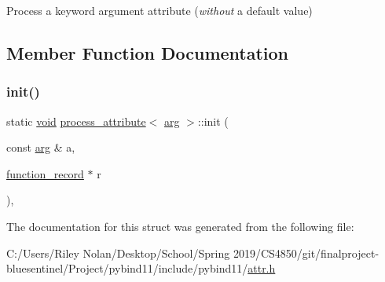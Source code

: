 Process a keyword argument attribute ({\itshape without} a default value) 

\subsection{Member Function Documentation}
\mbox{\label{structprocess__attribute_3_01arg_01_4_a256bf466859197e079b902fb77c5d01c}} 
\subsubsection{\texorpdfstring{init()}{init()}}
{\footnotesize\ttfamily static \mbox{\hyperlink{_s_d_l__opengles2__gl2ext_8h_ae5d8fa23ad07c48bb609509eae494c95}{void}} \mbox{\hyperlink{structprocess__attribute}{process\+\_\+attribute}}$<$ \mbox{\hyperlink{structarg}{arg}} $>$\+::init (\begin{DoxyParamCaption}\item[{const \mbox{\hyperlink{structarg}{arg}} \&}]{a,  }\item[{\mbox{\hyperlink{structfunction__record}{function\+\_\+record}} $\ast$}]{r }\end{DoxyParamCaption})\hspace{0.3cm}{\ttfamily [inline]}, {\ttfamily [static]}}



The documentation for this struct was generated from the following file\+:\begin{DoxyCompactItemize}
\item 
C\+:/\+Users/\+Riley Nolan/\+Desktop/\+School/\+Spring 2019/\+C\+S4850/git/finalproject-\/bluesentinel/\+Project/pybind11/include/pybind11/\mbox{\hyperlink{attr_8h}{attr.\+h}}\end{DoxyCompactItemize}
